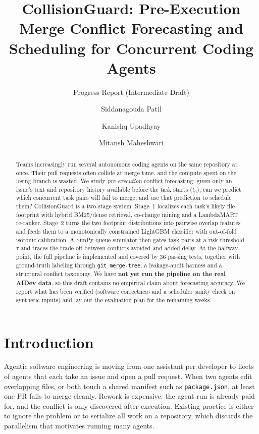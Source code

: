 \documentclass[sigconf, authorversion, nonacm]{acmart}
\begin{document}
\title{CollisionGuard: Pre-Execution Merge Conflict Forecasting and Scheduling for Concurrent Coding Agents}
\subtitle{Progress Report (Intermediate Draft)}

\author{Siddanagouda Patil}
\affiliation{\institution{}\country{}}
\author{Kanishq Upadhyay}
\affiliation{\institution{}\country{}}
\author{Mitansh Maheshwari}
\affiliation{\institution{}\country{}}

\begin{abstract}
Teams increasingly run several autonomous coding agents on the same repository at once. Their pull requests often collide at merge time, and the compute spent on the losing branch is wasted. We study \emph{pre-execution} conflict forecasting: given only an issue's text and repository history available before the task starts ($t_0$), can we predict which concurrent task pairs will fail to merge, and use that prediction to schedule them? CollisionGuard is a two-stage system. Stage~1 localizes each task's likely file footprint with hybrid BM25/dense retrieval, co-change mining and a LambdaMART re-ranker. Stage~2 turns the two footprint distributions into pairwise overlap features and feeds them to a monotonically constrained LightGBM classifier with out-of-fold isotonic calibration. A SimPy queue simulator then gates task pairs at a risk threshold $\tau$ and traces the trade-off between conflicts avoided and added delay. At the halfway point, the full pipeline is implemented and covered by 36 passing tests, together with ground-truth labeling through \texttt{git merge-tree}, a leakage-audit harness and a structural conflict taxonomy. We have \textbf{not yet run the pipeline on the real AIDev data}, so this draft contains no empirical claim about forecasting accuracy. We report what has been verified (software correctness and a scheduler sanity check on synthetic inputs) and lay out the evaluation plan for the remaining weeks.
\end{abstract}

\maketitle

\section{Introduction}
Agentic software engineering is moving from one assistant per developer to fleets of agents that each take an issue and open a pull request. When two agents edit overlapping files, or both touch a shared manifest such as \texttt{package.json}, at least one PR fails to merge cleanly. Rework is expensive: the agent run is already paid for, and the conflict is only discovered after execution. Existing practice is either to ignore the problem or to serialize all work on a repository, which discards the parallelism that motivates running many agents.
\end{document}
